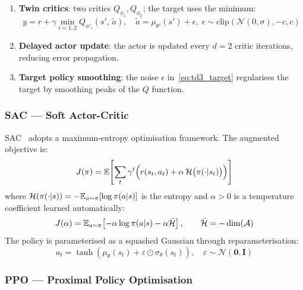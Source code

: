 \begin{enumerate}
  \item \textbf{Twin critics}: two critics $Q_{\phi_1}, Q_{\phi_2}$; the target
        uses the minimum:
        \begin{equation}
          y = r + \gamma \min_{i=1,2} Q_{\phi'_i}\!\left(s',\, \tilde{a}\right),
          \quad \tilde{a} = \mu_{\theta'}(s') + \epsilon, \;
          \epsilon \sim \mathrm{clip}\!\left(\mathcal{N}(0,\sigma), -c, c\right)
          \label{eq:td3_target}
        \end{equation}
  \item \textbf{Delayed actor update}: the actor is updated every $d=2$
        critic iterations, reducing error propagation.
  \item \textbf{Target policy smoothing}: the noise $\epsilon$
        in~\eqref{eq:td3_target} regularises the target by smoothing peaks of the
        $Q$ function.
\end{enumerate}

\subsubsection{SAC — Soft Actor-Critic}

SAC~\parencite{Haarnoja2018} adopts a maximum-entropy optimisation framework.
The augmented objective is:
\begin{equation}
  J(\pi) = \mathbb{E}\!\left[\sum_t \gamma^t \Bigl(r(s_t, a_t)
         + \alpha\,\mathcal{H}\bigl(\pi(\cdot|s_t)\bigr)\Bigr)\right]
  \label{eq:sac_objective}
\end{equation}
where $\mathcal{H}(\pi(\cdot|s)) = -\mathbb{E}_{a\sim\pi}[\log\pi(a|s)]$ is the entropy and
$\alpha > 0$ is a temperature coefficient learned automatically:
\begin{equation}
  J(\alpha) = \mathbb{E}_{a\sim\pi}\!\left[-\alpha\log\pi(a|s) - \alpha\bar{\mathcal{H}}\right],
  \qquad \bar{\mathcal{H}} = -\dim(\mathcal{A})
  \label{eq:sac_alpha}
\end{equation}
The policy is parameterised as a squashed Gaussian through reparameterisation:
\begin{equation}
  a_t = \tanh\!\left(\mu_\theta(s_t) + \varepsilon \odot \sigma_\theta(s_t)\right),
  \quad \varepsilon \sim \mathcal{N}(\mathbf{0}, \mathbf{I})
  \label{eq:sac_policy}
\end{equation}

\subsubsection{PPO --- Proximal Policy Optimisation}

